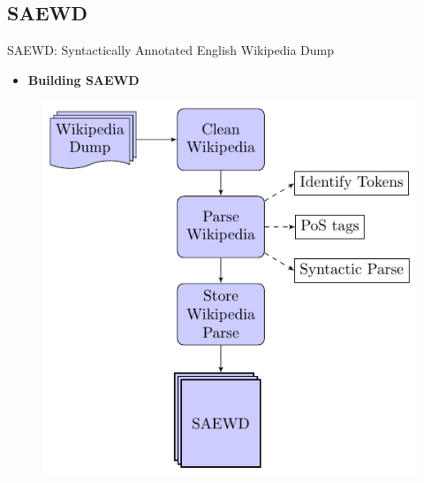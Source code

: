\documentclass[10pt,xcolor=table]{beamer}
\begin{document}
\subsection{SAEWD}
\begin{frame}{SAEWD: Syntactically Annotated English Wikipedia Dump}

\begin{itemize}
	\item[] \textbf{Building SAEWD}
\end{itemize}

\begin{figure}
\centering
\includegraphics[width=0.5\linewidth]{img/saewd_flow_chart}
\end{figure}

\end{frame}
\end{document}
